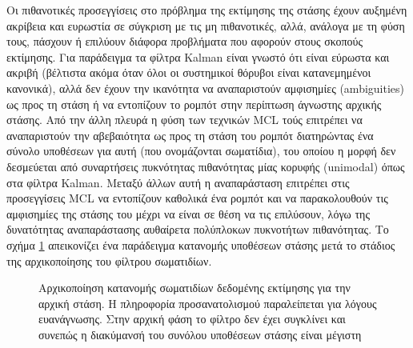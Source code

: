 Οι πιθανοτικές προσεγγίσεις στο πρόβλημα της εκτίμησης της στάσης έχουν
αυξημένη ακρίβεια και ευρωστία σε σύγκριση με τις μη πιθανοτικές, αλλά, ανάλογα
με τη φύση τους, πάσχουν ή επιλύουν διάφορα προβλήματα που αφορούν στους
σκοπούς εκτίμησης. Για παράδειγμα τα φίλτρα Kalman είναι γνωστό ότι είναι
εύρωστα και ακριβή (βέλτιστα ακόμα όταν όλοι οι συστημικοί θόρυβοι είναι
κατανεμημένοι κανονικά), αλλά δεν έχουν την ικανότητα να αναπαριστούν
αμφισημίες (ambiguities) ως προς τη στάση ή να εντοπίζουν το ρομπότ στην
περίπτωση άγνωστης αρχικής στάσης. Από την άλλη πλευρά η φύση των τεχνικών MCL
\cite{Dellaert} τούς επιτρέπει να αναπαριστούν την αβεβαιότητα ως προς τη στάση
του ρομπότ διατηρώντας ένα σύνολο υποθέσεων για αυτή (που ονομάζονται
σωματίδια), του οποίου η μορφή δεν δεσμεύεται από συναρτήσεις πυκνότητας
πιθανότητας μίας κορυφής (unimodal) όπως στα φίλτρα Kalman. Μεταξύ άλλων αυτή η
αναπαράσταση επιτρέπει στις προσεγγίσεις MCL να εντοπίζουν καθολικά ένα ρομπότ
και να παρακολουθούν τις αμφισημίες της στάσης του μέχρι να είναι σε θέση να
τις επιλύσουν, λόγω της δυνατότητας αναπαράστασης αυθαίρετα πολύπλοκων
πυκνοτήτων πιθανότητας. Το σχήμα \ref{fig:pf_init} απεικονίζει ένα παράδειγμα
κατανομής υποθέσεων στάσης μετά το στάδιος της αρχικοποίησης του φίλτρου
σωματιδίων.

\begin{figure}[htbp]\centering
  
  \caption{\small Αρχικοποίηση κατανομής σωματιδίων δεδομένης εκτίμησης για την
           αρχική στάση. Η πληροφορία προσανατολισμού παραλείπεται για λόγους
           ευανάγνωσης. Στην αρχική φάση το φίλτρο δεν έχει συγκλίνει και
           συνεπώς η διακύμανσή του συνόλου υποθέσεων στάσης είναι μέγιστη}
  \label{fig:pf_init}
\end{figure}

